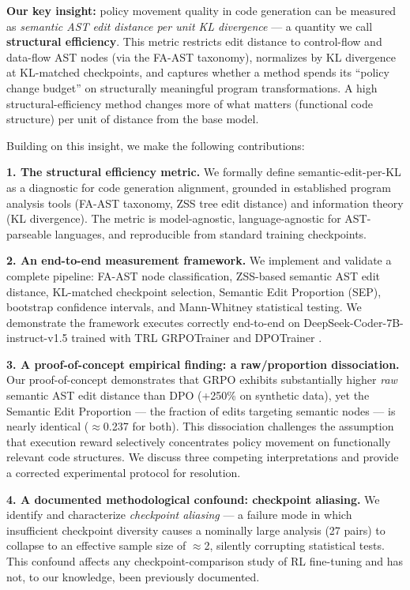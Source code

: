 \textbf{Our key insight:} policy movement quality in code generation can be measured
as \emph{semantic AST edit distance per unit KL divergence} --- a quantity we call
\textbf{structural efficiency}. This metric restricts edit distance to control-flow
and data-flow AST nodes (via the FA-AST taxonomy), normalizes by KL divergence
at KL-matched checkpoints, and captures whether a method spends its ``policy
change budget'' on structurally meaningful program transformations. A high
structural-efficiency method changes more of what matters (functional code
structure) per unit of distance from the base model.

Building on this insight, we make the following contributions:

\textbf{1. The structural efficiency metric.} We formally define semantic-edit-per-KL
as a diagnostic for code generation alignment, grounded in established program
analysis tools (FA-AST taxonomy, ZSS tree edit distance) and information theory
(KL divergence). The metric is model-agnostic, language-agnostic for
AST-parseable languages, and reproducible from standard training checkpoints.

\textbf{2. An end-to-end measurement framework.} We implement and validate a complete
pipeline: FA-AST node classification, ZSS-based semantic AST edit distance,
KL-matched checkpoint selection, Semantic Edit Proportion (SEP), bootstrap
confidence intervals, and Mann-Whitney statistical testing. We demonstrate the
framework executes correctly end-to-end on DeepSeek-Coder-7B-instruct-v1.5
\cite{Guo2024DeepSeek} trained with TRL GRPOTrainer and DPOTrainer \cite{vonWerra2020TRL}.

\textbf{3. A proof-of-concept empirical finding: a raw/proportion dissociation.} Our proof-of-concept
demonstrates that GRPO exhibits substantially higher \emph{raw} semantic AST edit
distance than DPO (+250\% on synthetic data), yet the Semantic Edit Proportion ---
the fraction of edits targeting semantic nodes --- is nearly identical ($\approx$0.237 for
both). This dissociation challenges the assumption that execution reward
selectively concentrates policy movement on functionally relevant code structures.
We discuss three competing interpretations and provide a corrected experimental
protocol for resolution.

\textbf{4. A documented methodological confound: checkpoint aliasing.} We identify
and characterize \emph{checkpoint aliasing} --- a failure mode in which insufficient
checkpoint diversity causes a nominally large analysis (27 pairs) to collapse to
an effective sample size of $\approx$2, silently corrupting statistical tests. This
confound affects any checkpoint-comparison study of RL fine-tuning and has not,
to our knowledge, been previously documented.

